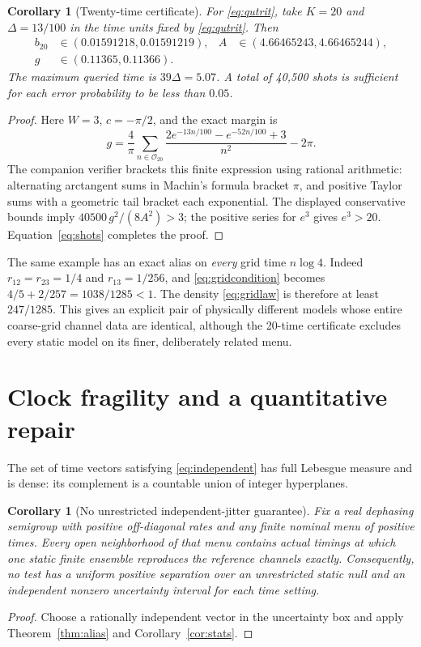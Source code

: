 \documentclass[11pt,a4paper]{article}
\newtheorem{corollary}[theorem]{Corollary}
\theoremstyle{remark}\newtheorem{remark}[theorem]{Remark}
\begin{document}
\begin{corollary}[Twenty-time certificate]\label{cor:20}
For \eqref{eq:qutrit}, take $K=20$ and $\Delta=13/100$ in the time
units fixed by \eqref{eq:qutrit}. Then
\begin{align*}
 b_{20}&\in(0.01591218,0.01591219),&
 A&\in(4.66465243,4.66465244),\\
 g&\in(0.11365,0.11366).&&
\end{align*}
The maximum queried time is $39\Delta=5.07$. A total of 40,500 shots
is sufficient for each error probability to be less than $0.05$.
\end{corollary}
\begin{proof}
Here $W=3$, $c=-\pi/2$, and the exact margin is
\begin{equation}\label{eq:qmargin}
 g=\frac4\pi\sum_{n\in\mathcal O_{20}}
       \frac{2e^{-13n/100}-e^{-52n/100}+3}{n^2}-2\pi.
\end{equation}
The companion verifier brackets this finite expression using rational
arithmetic: alternating arctangent sums in Machin's formula bracket
$\pi$, and positive Taylor sums with a geometric tail bracket each
exponential. The displayed conservative bounds imply
$40500\,g^2/(8A^2)>3$; the positive series for $e^3$ gives $e^3>20$.
Equation~\eqref{eq:shots} completes the proof.
\end{proof}

The same example has an exact alias on \emph{every} grid time
$n\log4$. Indeed $r_{12}=r_{23}=1/4$ and $r_{13}=1/256$, and
\eqref{eq:gridcondition} becomes
$4/5+2/257=1038/1285<1$.
The density \eqref{eq:gridlaw} is therefore at least $247/1285$.
This gives an explicit pair of physically different models whose entire
coarse-grid channel data are identical, although the 20-time certificate
excludes every static model on its finer, deliberately related menu.

\section{Clock fragility and a quantitative repair}\label{sec:clock}
The set of time vectors satisfying \eqref{eq:independent} has full
Lebesgue measure and is dense: its complement is a countable union of
integer hyperplanes.

\begin{corollary}[No unrestricted independent-jitter guarantee]
\label{cor:jitter}
Fix a real dephasing semigroup with positive off-diagonal rates and any
finite nominal menu of positive times. Every open neighborhood of that
menu contains actual timings at which one static finite ensemble
reproduces the reference channels exactly. Consequently, no test has a
uniform positive separation over an unrestricted static null and an
independent nonzero uncertainty interval for each time setting.
\end{corollary}
\begin{proof}
Choose a rationally independent vector in the uncertainty box and apply
Theorem~\ref{thm:alias} and Corollary~\ref{cor:stats}.
\end{proof}
\end{document}
